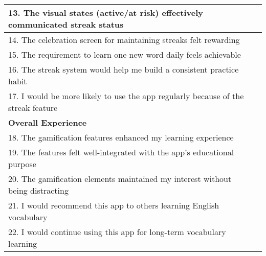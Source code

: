 \begin{table}[h]
{\begin{tabular}{|p{}|c|}
            \hline
            13. The visual states (active/at risk) effectively communicated streak status & \\
            \hline
            14. The celebration screen for maintaining streaks felt rewarding & \\
            \hline
            15. The requirement to learn one new word daily feels achievable & \\
            \hline
            16. The streak system would help me build a consistent practice habit & \\
            \hline
            17. I would be more likely to use the app regularly because of the streak feature & \\
            \hline
            \multicolumn{2}{|l|}{\textbf{Overall Experience}} \\
            \hline
            18. The gamification features enhanced my learning experience & \\
            \hline
            19. The features felt well-integrated with the app's educational purpose & \\
            \hline
            20. The gamification elements maintained my interest without being distracting & \\
            \hline
            21. I would recommend this app to others learning English vocabulary & \\
            \hline
            22. I would continue using this app for long-term vocabulary learning & \\
            \hline
        \end{tabular}
    }
\end{table}